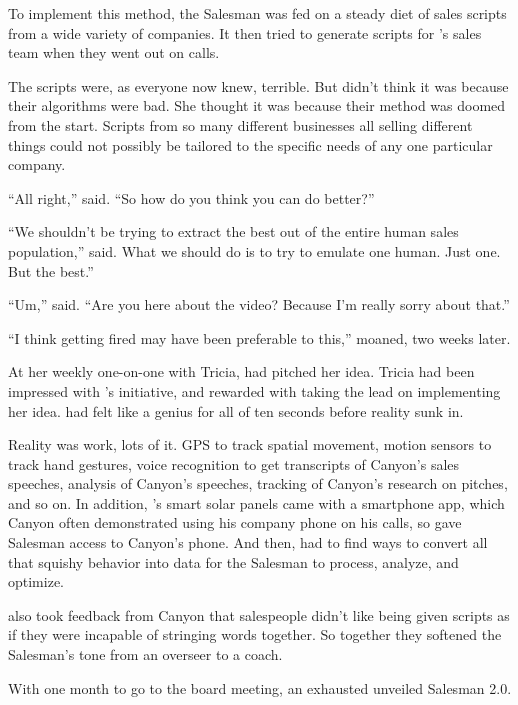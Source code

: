 To implement this method, the Salesman was fed on a steady diet of sales scripts from a wide variety of companies. It then tried to generate scripts for \energyCompany{}'s sales team when they went out on calls.

The scripts were, as everyone now knew, terrible. But {\protag} didn't think it was because their algorithms were bad. She thought it was because their method was doomed from the start. Scripts from so many different businesses all selling different things could not possibly be tailored to the specific needs of any one particular company.

``All right,'' {\sidetag} said. ``So how do you think you can do better?''

``We shouldn't be trying to extract the best out of the entire human sales population,'' {\protag} said. What we should do is to try to emulate one human. Just one. But the best.''

\bigbreak

``Um,'' {\energyJerk} said. ``Are you here about the video? Because I'm really sorry about that.''

\bigbreak

``I think getting fired may have been preferable to this,'' {\protag} moaned, two weeks later.

At her weekly one-on-one with Tricia, {\protag} had pitched her idea. Tricia had been impressed with {\protag}'s initiative, and rewarded {\protag} with taking the lead on implementing her idea. {\protag} had felt like a genius for all of ten seconds before reality sunk in.

Reality was work, lots of it. GPS to track spatial movement, motion sensors to track hand gestures, voice recognition to get transcripts of Canyon's sales speeches, analysis of Canyon's speeches, tracking of Canyon's research on pitches, and so on. In addition, \energyCompany{}'s smart solar panels came with a smartphone app, which Canyon often demonstrated using his company phone on his calls, so {\protag} gave Salesman access to Canyon's phone. And then, {\protag} had to find ways to convert all that squishy behavior into data for the Salesman to process, analyze, and optimize.

{\protag} also took feedback from Canyon that salespeople didn't like being given scripts as if they were incapable of stringing words together. So together they softened the Salesman's tone from an overseer to a coach.

With one month to go to the board meeting, an exhausted {\protag} unveiled Salesman 2.0.

